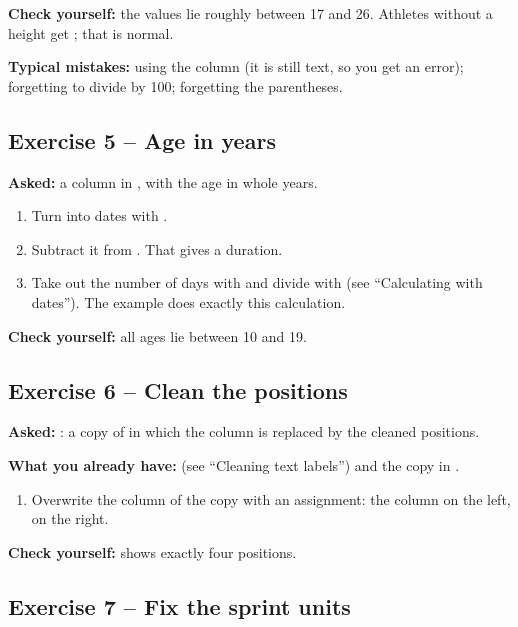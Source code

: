 \documentclass[11pt,a4paper]{article}
\begin{document}
\textbf{Check yourself:} the values lie roughly between 17 and 26. Athletes
without a height get ; that is normal.

\textbf{Typical mistakes:} using the  column (it is still
text, so you get an error); forgetting to divide by 100; forgetting the
parentheses.

\subsection*{Exercise 5 -- Age in years}

\textbf{Asked:} a column  in , with the
age in whole years.

\begin{enumerate}
  \item Turn  into dates with .
  \item Subtract it from . That gives a duration.
  \item Take out the number of days with  and divide with
         (see ``Calculating with dates''). The example
         does exactly this calculation.
\end{enumerate}

\textbf{Check yourself:} all ages lie between 10 and 19.

\subsection*{Exercise 6 -- Clean the positions}

\textbf{Asked:} : a copy of  in
which the  column is replaced by the cleaned positions.

\textbf{What you already have:}  (see ``Cleaning text
labels'') and the copy in .

\begin{enumerate}
  \item Overwrite the  column of the copy with an
        assignment: the column on the left,  on the
        right.
\end{enumerate}

\textbf{Check yourself:} 
shows exactly four positions.

\subsection*{Exercise 7 -- Fix the sprint units}
\end{document}
